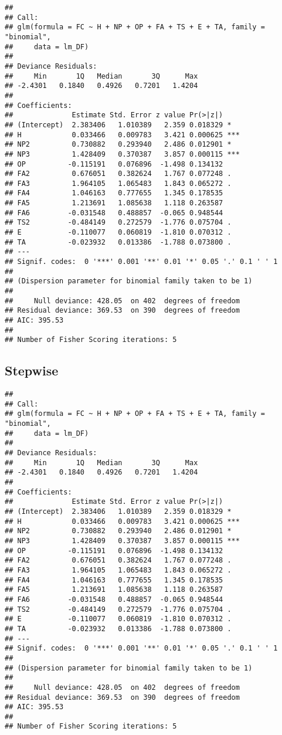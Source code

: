 \documentclass[]{article}
\begin{document}
\begin{verbatim}
## 
## Call:
## glm(formula = FC ~ H + NP + OP + FA + TS + E + TA, family = "binomial", 
##     data = lm_DF)
## 
## Deviance Residuals: 
##     Min       1Q   Median       3Q      Max  
## -2.4301   0.1840   0.4926   0.7201   1.4204  
## 
## Coefficients:
##              Estimate Std. Error z value Pr(>|z|)    
## (Intercept)  2.383406   1.010389   2.359 0.018329 *  
## H            0.033466   0.009783   3.421 0.000625 ***
## NP2          0.730882   0.293940   2.486 0.012901 *  
## NP3          1.428409   0.370387   3.857 0.000115 ***
## OP          -0.115191   0.076896  -1.498 0.134132    
## FA2          0.676051   0.382624   1.767 0.077248 .  
## FA3          1.964105   1.065483   1.843 0.065272 .  
## FA4          1.046163   0.777655   1.345 0.178535    
## FA5          1.213691   1.085638   1.118 0.263587    
## FA6         -0.031548   0.488857  -0.065 0.948544    
## TS2         -0.484149   0.272579  -1.776 0.075704 .  
## E           -0.110077   0.060819  -1.810 0.070312 .  
## TA          -0.023932   0.013386  -1.788 0.073800 .  
## ---
## Signif. codes:  0 '***' 0.001 '**' 0.01 '*' 0.05 '.' 0.1 ' ' 1
## 
## (Dispersion parameter for binomial family taken to be 1)
## 
##     Null deviance: 428.05  on 402  degrees of freedom
## Residual deviance: 369.53  on 390  degrees of freedom
## AIC: 395.53
## 
## Number of Fisher Scoring iterations: 5
\end{verbatim}

\hypertarget{stepwise}{%
\subsection{Stepwise}\label{stepwise}}

\begin{verbatim}
## 
## Call:
## glm(formula = FC ~ H + NP + OP + FA + TS + E + TA, family = "binomial", 
##     data = lm_DF)
## 
## Deviance Residuals: 
##     Min       1Q   Median       3Q      Max  
## -2.4301   0.1840   0.4926   0.7201   1.4204  
## 
## Coefficients:
##              Estimate Std. Error z value Pr(>|z|)    
## (Intercept)  2.383406   1.010389   2.359 0.018329 *  
## H            0.033466   0.009783   3.421 0.000625 ***
## NP2          0.730882   0.293940   2.486 0.012901 *  
## NP3          1.428409   0.370387   3.857 0.000115 ***
## OP          -0.115191   0.076896  -1.498 0.134132    
## FA2          0.676051   0.382624   1.767 0.077248 .  
## FA3          1.964105   1.065483   1.843 0.065272 .  
## FA4          1.046163   0.777655   1.345 0.178535    
## FA5          1.213691   1.085638   1.118 0.263587    
## FA6         -0.031548   0.488857  -0.065 0.948544    
## TS2         -0.484149   0.272579  -1.776 0.075704 .  
## E           -0.110077   0.060819  -1.810 0.070312 .  
## TA          -0.023932   0.013386  -1.788 0.073800 .  
## ---
## Signif. codes:  0 '***' 0.001 '**' 0.01 '*' 0.05 '.' 0.1 ' ' 1
## 
## (Dispersion parameter for binomial family taken to be 1)
## 
##     Null deviance: 428.05  on 402  degrees of freedom
## Residual deviance: 369.53  on 390  degrees of freedom
## AIC: 395.53
## 
## Number of Fisher Scoring iterations: 5
\end{verbatim}
\end{document}
